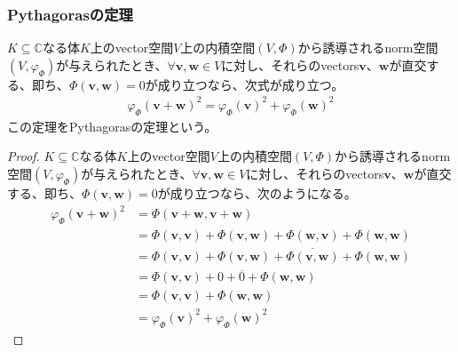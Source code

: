 \documentclass[dvipdfmx]{jsarticle}
\begin{document}
\subsubsection{Pythagorasの定理}%
\begin{thm}[Pythagorasの定理]\label{2.3.6.13}
$K \subseteq \mathbb{C}$なる体$K$上のvector空間$V$上の内積空間$(V,\varPhi)$から誘導されるnorm空間$\left( V,\varphi_{\varPhi} \right)$が与えられたとき、$\forall\mathbf{v},\mathbf{w} \in V$に対し、それらのvectors$\mathbf{v}$、$\mathbf{w}$が直交する、即ち、$\varPhi\left( \mathbf{v},\mathbf{w} \right) = 0$が成り立つなら、次式が成り立つ。
\begin{align*}
{\varphi_{\varPhi}\left( \mathbf{v} + \mathbf{w} \right)}^{2} = {\varphi_{\varPhi}\left( \mathbf{v} \right)}^{2} + {\varphi_{\varPhi}\left( \mathbf{w} \right)}^{2}
\end{align*}
この定理をPythagorasの定理という。
\end{thm}
\begin{proof}
$K \subseteq \mathbb{C}$なる体$K$上のvector空間$V$上の内積空間$(V,\varPhi)$から誘導されるnorm空間$\left( V,\varphi_{\varPhi} \right)$が与えられたとき、$\forall\mathbf{v},\mathbf{w} \in V$に対し、それらのvectors$\mathbf{v}$、$\mathbf{w}$が直交する、即ち、$\varPhi\left( \mathbf{v},\mathbf{w} \right) = 0$が成り立つなら、次のようになる。
\begin{align*}
{\varphi_{\varPhi}\left( \mathbf{v} + \mathbf{w} \right)}^{2} &= \varPhi\left( \mathbf{v} + \mathbf{w},\mathbf{v} + \mathbf{w} \right)\\
&= \varPhi\left( \mathbf{v},\mathbf{v} \right) + \varPhi\left( \mathbf{v},\mathbf{w} \right) + \varPhi\left( \mathbf{w},\mathbf{v} \right) + \varPhi\left( \mathbf{w},\mathbf{w} \right)\\
&= \varPhi\left( \mathbf{v},\mathbf{v} \right) + \varPhi\left( \mathbf{v},\mathbf{w} \right) + \overline{\varPhi\left( \mathbf{v},\mathbf{w} \right)} + \varPhi\left( \mathbf{w},\mathbf{w} \right)\\
&= \varPhi\left( \mathbf{v},\mathbf{v} \right) + 0 + \overline{0} + \varPhi\left( \mathbf{w},\mathbf{w} \right)\\
&= \varPhi\left( \mathbf{v},\mathbf{v} \right) + \varPhi\left( \mathbf{w},\mathbf{w} \right)\\
&= {\varphi_{\varPhi}\left( \mathbf{v} \right)}^{2} + {\varphi_{\varPhi}\left( \mathbf{w} \right)}^{2}
\end{align*}
\end{proof}
\end{document}
